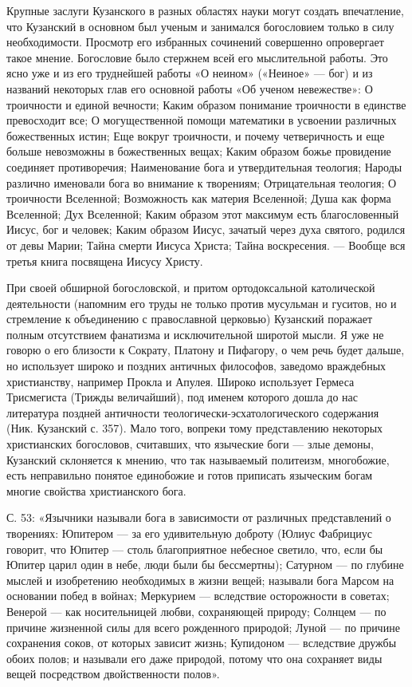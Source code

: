Крупные заслуги Кузанского в разных областях науки могут создать
впечатление, что Кузанский в основном был ученым и занимался
богословием только в силу необходимости. Просмотр его избранных
сочинений совершенно опровергает такое мнение. Богословие было
стержнем всей его мыслительной работы. Это ясно уже и из его
труднейшей работы «О неином» («Неиное» --- бог) и из названий
некоторых глав его основной работы «Об ученом невежестве»: О
троичности и единой вечности; Каким образом понимание троичности в
единстве превосходит все; О могущественной помощи математики в
усвоении различных божественных истин; Еще вокруг троичности, и почему
четверичность и еще больше невозможны в божественных вещах; Каким
образом божье провидение соединяет противоречия; Наименование бога и
утвердительная теология; Народы различно именовали бога во внимание к
творениям; Отрицательная теология; О троичности Вселенной; Возможность
как материя Вселенной; Душа как форма Вселенной; Дух Вселенной; Каким
образом этот максимум есть благословенный Иисус, бог и человек; Каким
образом Иисус, зачатый через духа святого, родился от девы Марии;
Тайна смерти Иисуса Христа; Тайна воскресения. --- Вообще вся третья
книга посвящена Иисусу Христу.

При своей обширной богословской, и притом ортодоксальной католической
деятельности (напомним его труды не только против мусульман и гуситов,
но и стремление к объединению с православной церковью) Кузанский
поражает полным отсутствием фанатизма и исключительной широтой мысли.
Я уже не говорю о его близости к Сократу, Платону и Пифагору, о чем
речь будет дальше, но использует широко и поздних античных философов,
заведомо враждебных христианству, например Прокла и Апулея. Широко
использует Гермеса Трисмегиста (Трижды величайший), под именем
которого дошла до нас литература поздней античности
теологически-эсхатологического содержания (Ник. Кузанский с. 357).
Мало того, вопреки тому представлению некоторых христианских
богословов, считавших, что языческие боги --- злые демоны, Кузанский
склоняется к мнению, что так называемый политеизм, многобожие, есть
неправильно понятое единобожие и готов приписать языческим богам
многие свойства христианского бога.

С. 53: «Язычники называли бога в зависимости от различных
представлений о творениях: Юпитером --- за его удивительную доброту
(Юлиус Фабрициус говорит, что Юпитер --- столь благоприятное небесное
светило, что, если бы Юпитер царил один в небе, люди были бы
бессмертны); Сатурном --- по глубине мыслей и изобретению необходимых
в жизни вещей; называли бога Марсом на основании побед в войнах;
Меркурием --- вследствие осторожности в советах; Венерой --- как
носительницей любви, сохраняющей природу; Солнцем --- по причине
жизненной силы для всего рожденного природой; Луной --- по причине
сохранения соков, от которых зависит жизнь; Купидоном --- вследствие
дружбы обоих полов; и называли его даже природой, потому что она
сохраняет виды вещей посредством двойственности полов».

